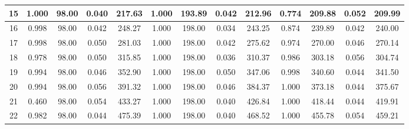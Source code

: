 \documentclass[12pt]{article}
\numberwithin{equation}{section}
\numberwithin{table}{section}
\numberwithin{thm}{section}
\numberwithin{defn}{section}
\numberwithin{lem}{section}
\numberwithin{prop}{section}
\numberwithin{cor}{section}
\numberwithin{rem}{section}
\begin{document}
\begin{appendix}
\begin{sidewaystable}[htbp]
\begin{tabular}{|c|cccc|cccc|cccc|}
15 & \multicolumn{1}{c|}{1.000} & \multicolumn{1}{c|}{98.00} & \multicolumn{1}{c|}{0.040} & 217.63 & \multicolumn{1}{c|}{1.000} & \multicolumn{1}{c|}{193.89} & \multicolumn{1}{c|}{0.042} & 212.96 & \multicolumn{1}{c|}{0.774} & \multicolumn{1}{c|}{209.88} & \multicolumn{1}{c|}{0.052} & 209.99 \\ \hline
16 & \multicolumn{1}{c|}{0.998} & \multicolumn{1}{c|}{98.00} & \multicolumn{1}{c|}{0.042} & 248.27 & \multicolumn{1}{c|}{1.000} & \multicolumn{1}{c|}{198.00} & \multicolumn{1}{c|}{0.034} & 243.25 & \multicolumn{1}{c|}{0.874} & \multicolumn{1}{c|}{239.89} & \multicolumn{1}{c|}{0.042} & 240.00 \\ \hline
17 & \multicolumn{1}{c|}{0.998} & \multicolumn{1}{c|}{98.00} & \multicolumn{1}{c|}{0.050} & 281.03 & \multicolumn{1}{c|}{1.000} & \multicolumn{1}{c|}{198.00} & \multicolumn{1}{c|}{0.042} & 275.62 & \multicolumn{1}{c|}{0.974} & \multicolumn{1}{c|}{270.00} & \multicolumn{1}{c|}{0.046} & 270.14 \\ \hline
18 & \multicolumn{1}{c|}{0.978} & \multicolumn{1}{c|}{98.00} & \multicolumn{1}{c|}{0.050} & 315.85 & \multicolumn{1}{c|}{1.000} & \multicolumn{1}{c|}{198.00} & \multicolumn{1}{c|}{0.036} & 310.37 & \multicolumn{1}{c|}{0.986} & \multicolumn{1}{c|}{303.18} & \multicolumn{1}{c|}{0.056} & 304.74 \\ \hline
19 & \multicolumn{1}{c|}{0.994} & \multicolumn{1}{c|}{98.00} & \multicolumn{1}{c|}{0.046} & 352.90 & \multicolumn{1}{c|}{1.000} & \multicolumn{1}{c|}{198.00} & \multicolumn{1}{c|}{0.050} & 347.06 & \multicolumn{1}{c|}{0.998} & \multicolumn{1}{c|}{340.60} & \multicolumn{1}{c|}{0.044} & 341.50 \\ \hline
20 & \multicolumn{1}{c|}{0.994} & \multicolumn{1}{c|}{98.00} & \multicolumn{1}{c|}{0.056} & 391.32 & \multicolumn{1}{c|}{1.000} & \multicolumn{1}{c|}{198.00} & \multicolumn{1}{c|}{0.046} & 384.37 & \multicolumn{1}{c|}{1.000} & \multicolumn{1}{c|}{373.18} & \multicolumn{1}{c|}{0.044} & 375.67 \\ \hline
21 & \multicolumn{1}{c|}{0.460} & \multicolumn{1}{c|}{98.00} & \multicolumn{1}{c|}{0.054} & 433.27 & \multicolumn{1}{c|}{1.000} & \multicolumn{1}{c|}{198.00} & \multicolumn{1}{c|}{0.040} & 426.84 & \multicolumn{1}{c|}{1.000} & \multicolumn{1}{c|}{418.44} & \multicolumn{1}{c|}{0.044} & 419.91 \\ \hline
22 & \multicolumn{1}{c|}{0.982} & \multicolumn{1}{c|}{98.00} & \multicolumn{1}{c|}{0.044} & 475.39 & \multicolumn{1}{c|}{1.000} & \multicolumn{1}{c|}{198.00} & \multicolumn{1}{c|}{0.040} & 468.52 & \multicolumn{1}{c|}{1.000} & \multicolumn{1}{c|}{455.78} & \multicolumn{1}{c|}{0.054} & 459.21 \\ \hline

\end{tabular}
\end{sidewaystable}
\end{appendix}
\end{document}
